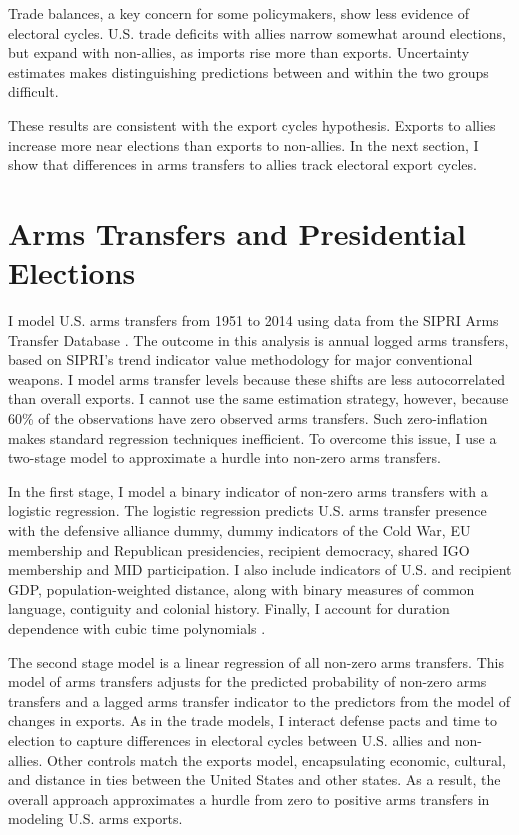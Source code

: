 \documentclass[12pt]{article}
\begin{document}
Trade balances, a key concern for some policymakers, show less evidence of electoral cycles. 
U.S. trade deficits with allies narrow somewhat around elections, but expand with non-allies, as imports rise more than exports. 
Uncertainty estimates makes distinguishing predictions between and within the two groups difficult.


These results are consistent with the export cycles hypothesis. 
Exports to allies increase more near elections than exports to non-allies.
In the next section, I show that differences in arms transfers to allies track electoral export cycles.



\section{Arms Transfers and Presidential Elections}


I model U.S. arms transfers from 1951 to 2014 using data from the SIPRI Arms Transfer Database \citep{SIPRI2021}.
The outcome in this analysis is annual logged arms transfers, based on SIPRI's trend indicator value methodology for major conventional weapons.
I model arms transfer levels because these shifts are less autocorrelated than overall exports.
I cannot use the same estimation strategy, however, because 60\% of the observations have zero observed arms transfers.
Such zero-inflation makes standard regression techniques inefficient.
To overcome this issue, I use a two-stage model to approximate a hurdle into non-zero arms transfers. 


In the first stage, I model a binary indicator of non-zero arms transfers with a logistic regression. 
The logistic regression predicts U.S. arms transfer presence with the defensive alliance dummy, dummy indicators of the Cold War, EU membership and Republican presidencies, recipient democracy, shared IGO membership and MID participation. 
I also include indicators of U.S. and recipient GDP, population-weighted distance, along with binary measures of common language, contiguity and colonial history. 
Finally, I account for duration dependence with cubic time polynomials \citep{CarterSignorino2010}.


The second stage model is a linear regression of all non-zero arms transfers.
This model of arms transfers adjusts for the predicted probability of non-zero arms transfers and a lagged arms transfer indicator to the predictors from the model of changes in exports.
As in the trade models, I interact defense pacts and time to election to capture differences in electoral cycles between U.S. allies and non-allies. 
Other controls match the exports model, encapsulating economic, cultural, and distance in ties between the United States and other states. 
As a result, the overall approach approximates a hurdle from zero to positive arms transfers in modeling U.S. arms exports. 
\end{document}
